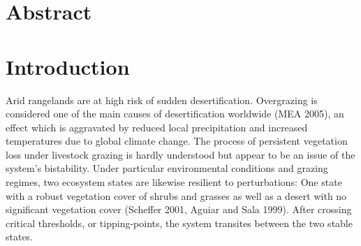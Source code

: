 
\section{Abstract}


\section{Introduction}

Arid rangelands are at high risk of sudden desertification. Overgrazing is considered one of the main causes of desertification worldwide (MEA 2005), an effect which is aggravated by reduced local precipitation and increased temperatures due to global climate change.  The process of persistent vegetation loss under livestock grazing is hardly understood but appear to be  an issue of the system's bistability. Under particular environmental conditions and grazing regimes, two ecosystem states are likewise resilient to perturbations: One state with a robust vegetation cover of shrubs and grasses as well as a desert with no significant vegetation cover (Scheffer 2001, Aguiar and Sala 1999). After crossing critical thresholds, or tipping-points, the system transites between the two stable states.


